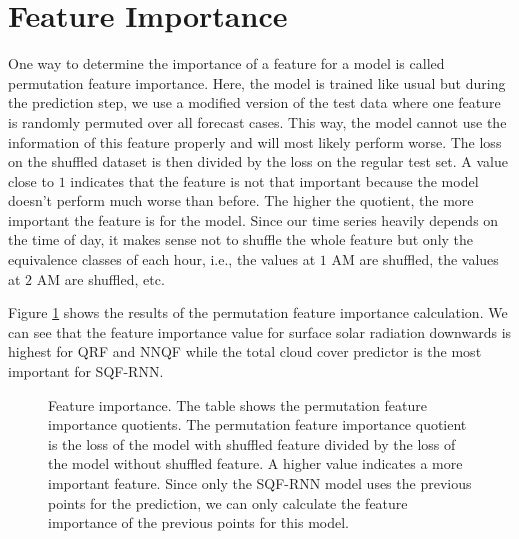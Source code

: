 \section{Feature Importance}
\label{sec:feature-importance}

One way to determine the importance of a feature for a model is called 
permutation feature importance. Here, the model is trained like usual but during the prediction step, 
we use a modified version of the test data where one feature is randomly permuted over all forecast cases. 
This way, the model cannot use the information of this feature properly 
and will most likely perform worse. The loss on the shuffled dataset is 
then divided by the loss on the regular test set. A value close to \(1\) 
indicates that the feature is not that important because the model doesn't perform 
much worse than before. The higher the quotient, the more important the feature is for the model.
Since our time series heavily depends on the time of day, it makes sense 
not to shuffle the whole feature but only the equivalence classes of each hour, 
i.e., the values at \(1\) AM are shuffled, the values at \(2\) AM are shuffled, etc.

Figure \ref{fig:feature-importance} 
shows the results of the permutation feature importance calculation. 
We can see that the feature importance value for surface solar radiation downwards 
is highest for QRF and NNQF while the total cloud cover predictor is the most important 
for SQF-RNN.

\begin{figure}[h!]
    
    \caption[Feature importance]{Feature importance. 
    The table shows the permutation feature importance quotients. 
    The permutation feature importance quotient is 
    the loss of the model with shuffled feature 
    divided by the loss of the model without shuffled feature. 
    A higher value indicates a more important feature.
    Since only the SQF-RNN model uses the previous points for the prediction, 
    we can only calculate the feature importance of the previous points for this model.}
    \label{fig:feature-importance}
\end{figure}